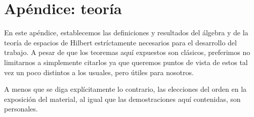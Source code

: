 \appendix 
\chapter{Apéndice: teoría}


En este apéndice, establecemos las
definiciones y resultados
del álgebra y
de la teoría de espacios de Hilbert
estríctamente
necesarios para el desarrollo del trabajo.
A pesar de que los teoremas aquí expuestos son
clásicos, preferimos no limitarnos a simplemente citarlos
ya que queremos puntos de vista de estos tal vez
un poco distintos a los usuales, pero útiles para nosotros.

A menos que se
diga explícitamente lo contrario,
las elecciones del
orden en la exposición del material, 
al igual que las demostraciones
aquí contenidas, son personales. 











